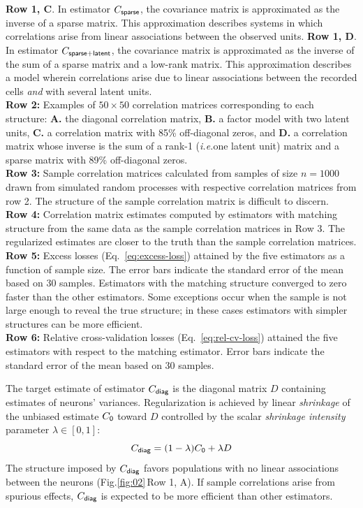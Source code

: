 \documentclass[10pt]{article}
\newcommand{\figref}[2]{Fig.\;\ref{fig:#1}\,#2}
\newcommand{\ie}{\emph{i.e.}\;}
\begin{document}
\begin{FPfigure}
{        {\bf  Row 1, C}. In estimator $C_{\sf sparse}$, the covariance matrix is approximated as the inverse of a sparse matrix. This approximation describes systems in which correlations arise from linear associations between the observed units.
        {\bf  Row 1, D}.  In estimator $C_{\sf sparse+latent}$, the covariance matrix is approximated as the inverse of the sum of a sparse matrix and a low-rank matrix. This approximation describes a model wherein correlations arise due to linear associations between the recorded cells \emph{and} with several latent units.
\\
{\bf Row 2:} Examples of $50\times 50$ correlation matrices corresponding to each structure: {\bf A.} the diagonal correlation matrix, {\bf B.} a factor model with two latent units, {\bf C.}  a correlation matrix with 85\%  off-diagonal zeros, and {\bf  D.} a correlation matrix whose inverse is the sum of a rank-1 (\ie one latent unit) matrix and a sparse matrix with 89\% off-diagonal zeros. 
\\
{\bf Row 3:} Sample correlation matrices calculated from samples of size $n=1000$ drawn from simulated random processes with respective correlation matrices from row 2.  The structure of the sample correlation matrix is difficult to discern.
\\
{\bf Row 4:} Correlation matrix estimates computed by estimators with matching structure from the same data as the sample correlation matrices in Row 3. The regularized estimates are closer to the truth than the sample correlation matrices.
\\
{\bf Row 5:} Excess losses (Eq.~\ref{eq:excess-loss}) attained by the five estimators as a function of sample size. The error bars indicate the standard error of the mean based on 30 samples.  Estimators with the matching structure converged to zero faster than the other estimators. Some exceptions occur when the sample is not large enough to reveal the true structure; in these cases estimators with simpler structures can be more efficient.
\\
{\bf Row 6:} Relative cross-validation losses (Eq.~\ref{eq:rel-cv-loss}) attained the five estimators with respect to the matching estimator. Error bars indicate the standard error of the mean based on 30 samples.
    }
    \label{fig:02}
\end{FPfigure} 

The target estimate of estimator $C_{\sf diag}$ is the diagonal matrix $D$ containing estimates of neurons' variances. Regularization is achieved by linear \emph{shrinkage} of the unbiased estimate $C_{\sf 0}$ toward $D$ controlled by the scalar \emph{shrinkage intensity} parameter $\lambda \in [0, 1]$:
\begin{equation}\label{eq:c-diag}
C_{\sf diag} = (1-\lambda) C_{\sf 0} + \lambda D
\end{equation}
The structure imposed by $C_{\sf diag}$ favors populations with no linear associations between the neurons (\figref{02}{Row 1, A}).  If sample correlations arise from spurious effects, $C_{\sf diag}$ is expected to be more efficient than other estimators. 
\end{document}

